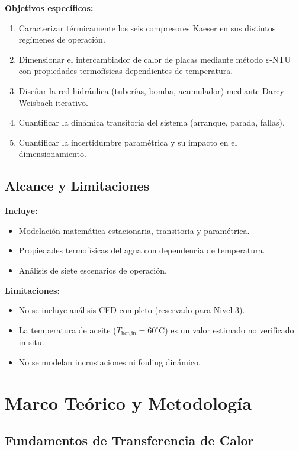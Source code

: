 \documentclass[11pt,a4paper]{report}
\begin{document}
\textbf{Objetivos específicos:}
\begin{enumerate}
  \item Caracterizar térmicamente los seis compresores Kaeser en sus distintos regímenes de operación.
  \item Dimensionar el intercambiador de calor de placas mediante método $\varepsilon$-NTU con propiedades termofísicas dependientes de temperatura.
  \item Diseñar la red hidráulica (tuberías, bomba, acumulador) mediante Darcy-Weisbach iterativo.
  \item Cuantificar la dinámica transitoria del sistema (arranque, parada, fallas).
  \item Cuantificar la incertidumbre paramétrica y su impacto en el dimensionamiento.
\end{enumerate}

\section{Alcance y Limitaciones}

\textbf{Incluye:}
\begin{itemize}
  \item Modelación matemática estacionaria, transitoria y paramétrica.
  \item Propiedades termofísicas del agua con dependencia de temperatura.
  \item Análisis de siete escenarios de operación.
\end{itemize}

\textbf{Limitaciones:}
\begin{itemize}
  \item No se incluye análisis CFD completo (reservado para Nivel 3).
  \item La temperatura de aceite ($T_{\text{hot,in}} = 60^\circ\text{C}$) es un valor estimado no verificado in-situ.
  \item No se modelan incrustaciones ni fouling dinámico.
\end{itemize}

\chapter{Marco Teórico y Metodología}

\section{Fundamentos de Transferencia de Calor}
\end{document}
